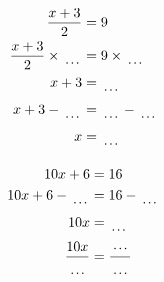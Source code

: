 \documentclass[12pt]{article}
\newcounter{minipagecount}
\begin{document}
\begin{multicols}{2}
\begin{minipage}[t]{0.45\textwidth}
    \raggedright %
    \begin{align*} %
        \frac{x + 3}{2} &= 9\\
        \frac{x + 3}{2} \times\dotuline{\hspace{5mm}} &= 9 \times\dotuline{\hspace{5mm}}\\
        x + 3 &= \dotuline{\hspace{5mm}}\\
        x + 3 - \dotuline{\hspace{5mm}} &= \dotuline{\hspace{5mm}} - \dotuline{\hspace{5mm}}\\
        x &= \dotuline{\hspace{5mm}}\\
    \end{align*}
\end{minipage} %
\noindent{(\theminipagecount)}\hspace{0.1mm} %
\begin{minipage}[t]{0.45\textwidth} %
    \vspace{-26pt}  %
    \raggedright %
    \begin{align*} %
        10x + 6 &= 16\\
        10x + 6 - \dotuline{\hspace{5mm}} &= 16 - \dotuline{\hspace{5mm}}\\
        10x &= \dotuline{\hspace{5mm}}\\
        \frac{10x}{\dotuline{\hspace{5mm}}} &= \frac{\dotuline{\hspace{5mm}}}{\dotuline{\hspace{5mm}}}\\

\end{align*}
\end{minipage}
\end{multicols}
\end{document}
